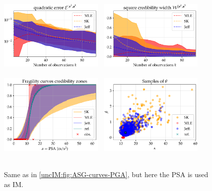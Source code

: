         
    \begin{figure}[!h]
        \centering
        {\includegraphics[width=5cm]{figures/uncIM/err_quadra_ASG_PSA.pdf}}\ %
        {\includegraphics[width=5cm]{figures/uncIM/err_cred_ASG_PSA.pdf}} \\
        \ \\
        {\includegraphics[width=5cm]{figures/uncIM/curves_ASG_PSA.pdf}}\ %
         {\includegraphics[width=5cm]{figures/uncIM/scatter_ASG_PSA.pdf}}\\
         \ \\
         \caption{Same as in \cref{uncIM:fig:ASG-curves-PGA}, but here the PSA is used as IM.}
           \label{uncIM:fig:ASG-curves-SA}
    \end{figure}


